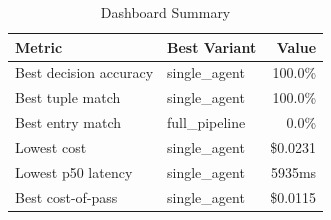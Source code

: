\begin{table}[htbp]
\centering
\caption{Dashboard Summary}
\label{tab:summary}
\begin{tabular}{l l r}
\toprule
Metric & Best Variant & Value \\
\midrule
  Best decision accuracy & single\_agent & 100.0\% \\
  Best tuple match & single\_agent & 100.0\% \\
  Best entry match & full\_pipeline & 0.0\% \\
  Lowest cost & single\_agent & \$0.0231 \\
  Lowest p50 latency & single\_agent & 5935ms \\
  Best cost-of-pass & single\_agent & \$0.0115 \\
\bottomrule
\end{tabular}
\end{table}
